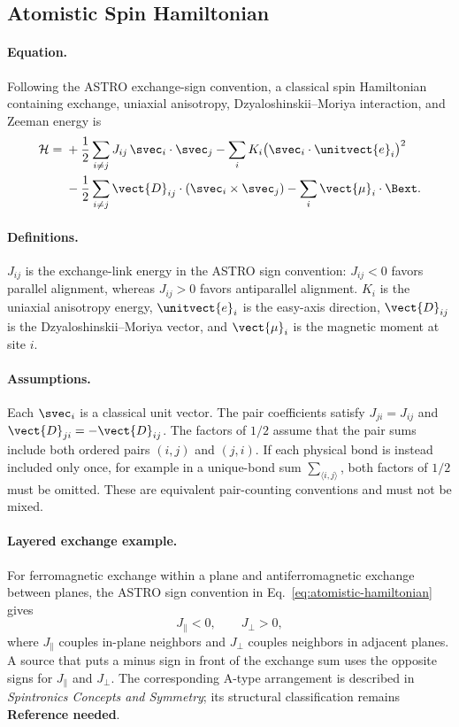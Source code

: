 \subsection{Atomistic Spin Hamiltonian}

\paragraph{Equation.}
Following the ASTRO exchange-sign convention, a classical spin Hamiltonian
containing exchange, uniaxial anisotropy, Dzyaloshinskii--Moriya interaction,
and Zeeman energy is
\begin{align}
    \mathcal{H}
    ={} & +\frac{1}{2}\sum_{i\ne j} J_{ij}\,\svec_i\cdot\svec_j
    -\sum_i K_i\bigl(\svec_i\cdot\unitvect{e}_i\bigr)^2
    \notag                                                      \\
        & -\frac{1}{2}\sum_{i\ne j}
    \vect{D}_{ij}\cdot(\svec_i\times\svec_j)
    -\sum_i \vect{\mu}_i\cdot\Bext.
    \label{eq:atomistic-hamiltonian}
\end{align}

\paragraph{Definitions.}
$J_{ij}$ is the exchange-link energy in the ASTRO sign convention: $J_{ij}<0$
favors parallel alignment, whereas $J_{ij}>0$ favors antiparallel alignment.
$K_i$ is the uniaxial anisotropy energy, $\unitvect{e}_i$ is the easy-axis
direction, $\vect{D}_{ij}$ is the Dzyaloshinskii--Moriya vector, and
$\vect{\mu}_i$ is the magnetic moment at site $i$.

\paragraph{Assumptions.}
Each $\svec_i$ is a classical unit vector.  The pair coefficients satisfy
$J_{ji}=J_{ij}$ and $\vect{D}_{ji}=-\vect{D}_{ij}$.  The factors of $1/2$
assume that the pair sums include both ordered pairs $(i,j)$ and $(j,i)$.
If each physical bond is instead included only once, for example in a
unique-bond sum $\sum_{\langle i,j\rangle}$, both factors of $1/2$ must be
omitted.  These are equivalent pair-counting conventions and must not be mixed.

\paragraph{Layered exchange example.}
For ferromagnetic exchange within a plane and antiferromagnetic exchange
between planes, the ASTRO sign convention in
Eq.~\eqref{eq:atomistic-hamiltonian} gives~\cite{astro-code}
\begin{equation}
    J_{\parallel}<0,
    \qquad
    J_{\perp}>0,
    \label{eq:a-type-exchange-signs}
\end{equation}
where $J_{\parallel}$ couples in-plane neighbors and $J_{\perp}$ couples
neighbors in adjacent planes.  A source that puts a minus sign in front of
the exchange sum uses the opposite signs for $J_{\parallel}$ and $J_{\perp}$.
The corresponding A-type arrangement is
described in \emph{Spintronics Concepts and Symmetry}; its structural
classification remains \textbf{Reference needed}.

